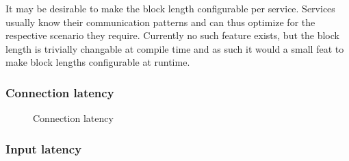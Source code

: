 It may be desirable to make the block length configurable per service.
Services usually know their communication patterns and can thus optimize for the respective scenario they require.
Currently no such feature exists, but the block length is trivially changable at compile time and as such it would a small feat to make block lengths configurable at runtime.

\subsubsection{Connection latency}

\begin{figure}[h]
    \centering
    \caption{Connection latency}
\end{figure}

\subsubsection{Input latency}

